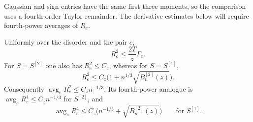 Gaussian and sign entries have the same first three moments, so the
comparison uses a fourth-order Taylor remainder.  The derivative estimates
below will require fourth-power averages of $R_e$.

\begin{lemma}\label{lem:comparison-residual}
Uniformly over the disorder and the pair $e$,
\begin{equation}\label{eq:source-44}
 R_e^2\le\frac{2T}{z}\Gamma_e.
\end{equation}
For $S=S^{[2]}$ one also has $R_e^2\le C_z$, whereas for $S=S^{[1]}$,
\begin{equation}\label{eq:source-45}
 R_e^2\le C_z\bigl(1+n^{1/3}\sqrt{B_n^{[2]}(z)}\bigr).
\end{equation}
Consequently $\operatorname{avg}_eR_e^2\le C_z n^{-1/3}$.  Its
fourth-power analogue is $\operatorname{avg}_eR_e^4\le C_z n^{-1/3}$ for
$S^{[2]}$, and
\begin{equation}\label{eq:source-46}
 \operatorname{avg}_eR_e^4
 \le C_z\bigl(n^{-1/3}+\sqrt{B_n^{[2]}(z)}\bigr)
 \qquad\text{for }S^{[1]}.
\end{equation}
\end{lemma}

